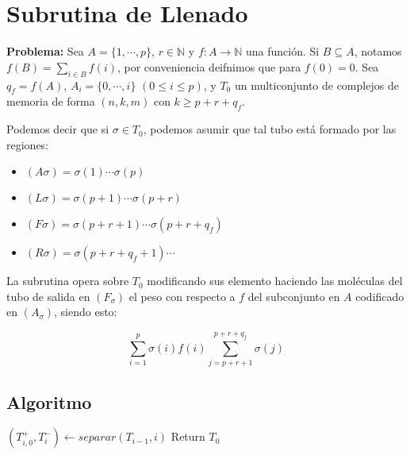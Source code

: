 \documentclass[12pt, letterpaper, twoside]{article}
\begin{document}
    \section{Subrutina de Llenado}
    \textbf{Problema:} Sea $A=\{1,\cdots,p\}$,  $r \in \mathbb{N}$ y $f:A\rightarrow\mathbb{N}$ una función. Si $B\subseteq A$, notamos $f(B)=\sum_{i\in B}f(i)$, por conveniencia deifnimos que para $f(0)=0$. Sea $q_f=f(A)$, $A_i=\{0,\cdots,i\}$ $(0\leq i\leq p)$, y $T_0$ un multiconjunto de complejos de memoria de forma $(n,k,m)$ con $k\geq p+r+q_f$.


    Podemos decir que si $\sigma\in T_0$, podemos asumir que tal tubo está formado por las regiones:
    \begin{multicols}{2}
        \begin{itemize}
            \item $(A\sigma )=\sigma (1)\cdots\sigma (p)$
            \item $(L\sigma )=\sigma (p+1)\cdots\sigma (p+r)$
            \item $(F\sigma)=\sigma(p+r+1)\cdots\sigma(p+r+q_f)$
            \item $(R\sigma)=\sigma(p+r+q_f+1)\cdots$
        \end{itemize} 
    \end{multicols}


    La subrutina opera sobre $T_0$ modificando sus elemento haciendo las moléculas del tubo de salida en $(F_\sigma)$ el peso con respecto a $f$ del subconjunto en $A$ codificado en $(A_\sigma)$, siendo esto:

    \begin{multicols}{2}
        \begin{equation*}
            \sum_{i=1}^{p}\sigma(i)f(i)
            \sum_{j=p+r+1}^{p+r+q_f}\sigma(j)
        \end{equation*}
    \end{multicols}


    \subsection{Algoritmo}
    \begin{algorithm}
        \begin{algorithmic}[1]
                \State $(T^+_{i,0}, T^-_i) \leftarrow separar(T_{i-1}, i)$
                \EndFor
            \EndFor
            \State Return $T_0$
            \EndProcedure
        \end{algorithmic}
    \end{algorithm}
\end{document}
